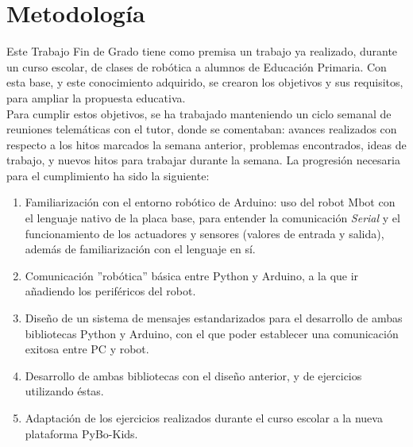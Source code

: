 \section{Metodología}\label{sec:metologia}
Este Trabajo Fin de Grado tiene como premisa un trabajo ya realizado, durante un curso escolar, de clases de robótica a alumnos de Educación Primaria. Con esta base, y este conocimiento adquirido, se crearon los objetivos y sus requisitos, para ampliar la propuesta educativa.\\
Para cumplir estos objetivos, se ha trabajado manteniendo un ciclo semanal de reuniones telemáticas con el tutor, donde se comentaban: avances realizados con respecto a los hitos marcados la semana anterior, problemas encontrados, ideas de trabajo, y nuevos hitos para trabajar durante la semana. La progresión necesaria para el cumplimiento ha sido la siguiente:
\begin{enumerate}
	\item Familiarización con el entorno robótico de Arduino: uso del robot Mbot con el lenguaje nativo de la placa base, para entender la comunicación \textit{Serial} y el funcionamiento de los actuadores y sensores (valores de entrada y salida), además de familiarización con el lenguaje en sí. 
	\item Comunicación ''robótica'' básica entre Python y Arduino, a la que ir añadiendo los periféricos del robot.
	\item Diseño de un sistema de mensajes estandarizados para el desarrollo de ambas bibliotecas Python y Arduino, con el que poder establecer una comunicación exitosa entre PC y robot.
	\item Desarrollo de ambas bibliotecas con el diseño anterior, y de ejercicios utilizando éstas.
	\item Adaptación de los ejercicios realizados durante el curso escolar a la nueva plataforma PyBo-Kids.  
\end{enumerate}